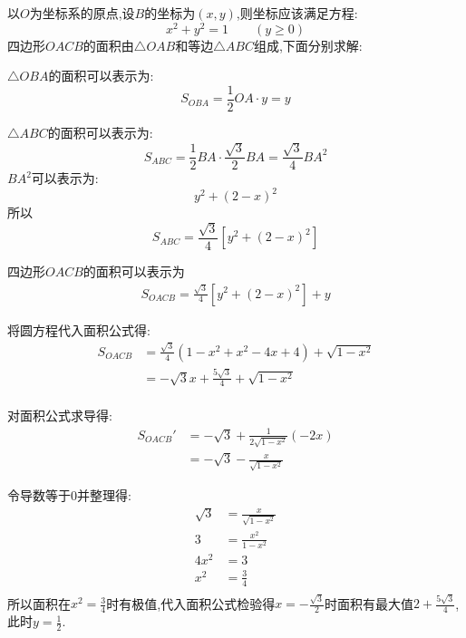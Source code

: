 \begin{questions}
	\begin{solution}
		以$O$为坐标系的原点,设$B$的坐标为$(x,y)$,则坐标应该满足方程:
		\begin{equation*}
			x^2 + y^2 = 1 \qquad (y \geqslant 0)
		\end{equation*}
		四边形$OACB$的面积由$\triangle{OAB}$和等边$\triangle{ABC}$组成,下面分别求解:
		\begin{cenum}
			\item $\triangle{OBA}$的面积可以表示为:
			      \begin{equation*}
				      S_{OBA} = \frac12 OA \cdot y = y
			      \end{equation*}
			\item $\triangle{ABC}$的面积可以表示为:
			      \begin{equation*}
				      S_{ABC} = \frac12BA\cdot\frac{\sqrt{3}}{2}BA = \frac{\sqrt{3}}{4}BA^2
			      \end{equation*}
			      $BA^2$可以表示为:
			      \begin{equation*}
				      y^2 + (2-x)^2
			      \end{equation*}
			      所以
			      \begin{equation*}
				      S_{ABC} = \frac{\sqrt{3}}{4}[y^2 + (2-x)^2]
			      \end{equation*}
			\item 四边形$OACB$的面积可以表示为
			      \begin{align*}
				      S_{OACB} = \frac{\sqrt{3}}{4}[y^2 + (2-x)^2] + y
			      \end{align*}
			\item 将圆方程代入面积公式得:
			      \begin{align*}
				      S_{OACB} & = \frac{\sqrt{3}}{4}(1-x^2 + x^2 - 4x + 4) + \sqrt{1-x^2} \\
				               & = -\sqrt{3}x + \frac{5\sqrt{3}}{4} + \sqrt{1-x^2}         \\
			      \end{align*}
			\item 对面积公式求导得:
			      \begin{align*}
				      S_{OACB}' & = -\sqrt{3}  + \frac{1}{2\sqrt{1-x^2}}(-2x) \\
				                & =  -\sqrt{3} - \frac{x}{\sqrt{1-x^2}}
			      \end{align*}
			\item 令导数等于$0$并整理得:
			      \begin{align*}
				      \sqrt{3} & = \frac{x}{\sqrt{1-x^2}} \\
				      3        & = \frac{x^2}{1-x^2}      \\
				      4x^2     & = 3                      \\
				      x^2      & = \frac34                \\
			      \end{align*}
			      所以面积在$x^2 = \frac34$时有极值,代入面积公式检验得$x=-\frac{\sqrt{3}}{2}$时面积有最大值$2 +
				      \frac{5\sqrt{3}}{4}$,此时$y=\frac12$.
		\end{cenum}
	\end{solution}


\end{questions}

